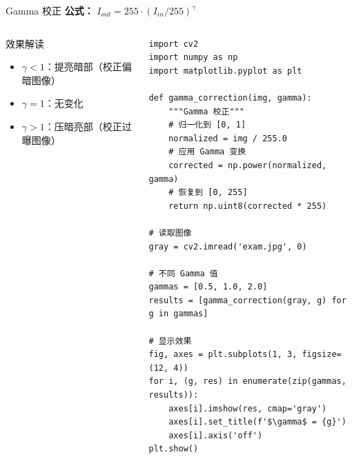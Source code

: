 \begin{frame}[fragile]{Gamma 校正}
    \textbf{公式：} $I_{out} = 255 \cdot (I_{in} / 255)^{\gamma}$

    \begin{columns}
        \begin{block}{效果解读}
            \begin{itemize}
                \item $\gamma < 1$：提亮暗部（校正偏暗图像）
                \item $\gamma = 1$：无变化
                \item $\gamma > 1$：压暗亮部（校正过曝图像）
            \end{itemize}
        \end{block}

        \begin{lstlisting}[basicstyle=\ttfamily\scriptsize]
import cv2
import numpy as np
import matplotlib.pyplot as plt

def gamma_correction(img, gamma):
    """Gamma 校正"""
    # 归一化到 [0, 1]
    normalized = img / 255.0
    # 应用 Gamma 变换
    corrected = np.power(normalized, gamma)
    # 恢复到 [0, 255]
    return np.uint8(corrected * 255)

# 读取图像
gray = cv2.imread('exam.jpg', 0)

# 不同 Gamma 值
gammas = [0.5, 1.0, 2.0]
results = [gamma_correction(gray, g) for g in gammas]

# 显示效果
fig, axes = plt.subplots(1, 3, figsize=(12, 4))
for i, (g, res) in enumerate(zip(gammas, results)):
    axes[i].imshow(res, cmap='gray')
    axes[i].set_title(f'$\gamma$ = {g}')
    axes[i].axis('off')
plt.show()
        \end{lstlisting}
    \end{columns}
\end{frame}

